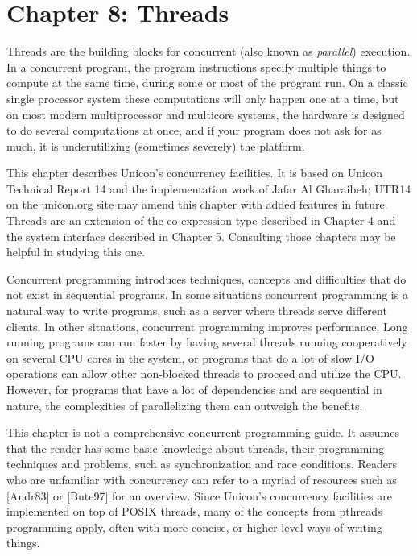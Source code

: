 \clearpage\section{Chapter 8: Threads}

Threads are the building blocks for concurrent (also known as
{\em parallel\/}) execution. In a concurrent program,  the program
instructions specify multiple things to compute at the same time,
during some or most of the program run.  On a classic single processor
system these computations will only happen one at a time, but on most
modern multiprocessor and multicore systems, the hardware is designed
to do several computations at once, and if your program does not ask
for as much, it is underutilizing (sometimes severely) the platform.

This chapter describes Unicon's concurrency facilities. It is based
on Unicon Technical Report 14 and the implementation work of Jafar
Al Gharaibeh; UTR14 on the unicon.org site may amend this chapter
with added features in future.
Threads are an extension of the co-expression type described in
Chapter 4 and the system interface described in Chapter 5.
Consulting those chapters may be helpful in studying this one.

Concurrent programming introduces techniques, concepts and difficulties
that do not exist in sequential programs. In some situations concurrent
programming is a natural way to write programs, such as a server where
threads serve different clients. In other situations, concurrent
programming improves performance. Long running programs can run faster
by having several threads running cooperatively on several CPU cores in
the system, or programs that do a lot of slow I/O operations can allow
other non-blocked threads to proceed and utilize the CPU. However, for
programs that have a lot of dependencies and are sequential in nature,
the complexities of parallelizing them can outweigh the benefits.

This chapter is not a comprehensive concurrent programming guide. It
assumes that the reader has some basic knowledge about threads, their
programming techniques
and problems, such as synchronization and race conditions. Readers who are
unfamiliar with concurrency can refer to a myriad of resources
such as [Andr83] or [Bute97] for an overview. Since Unicon{\textquoteright}s
concurrency facilities are implemented on top of POSIX threads, many of
the concepts from pthreads programming apply, often with more
concise, or higher-level ways of writing things.

